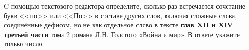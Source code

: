 \documentclass[14pt,a4paper]{article}
\begin{document}
C помощью текстового редактора определите, сколько раз встречается
сочетание букв <<по>> или <<По>> в составе других слов, включая
сложные слова, соединённые дефисом, но не как отдельное слово в
тексте \textbf{глав XII и XIV третьей части} тома 2 романа Л.Н.
Толстого «Война и мир». В ответе укажите только число.
\end{document}
